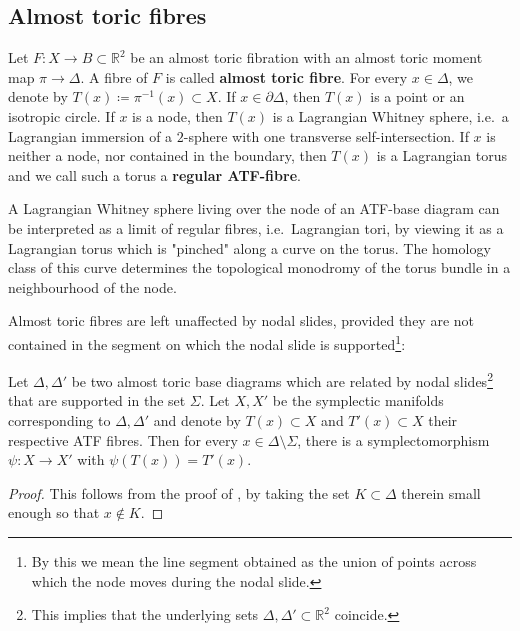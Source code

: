 \documentclass[12pt,a4paper,abstract=true,final]{scrartcl}
\begin{document}
\subsection{Almost toric fibres}
\label{sec:atfibres}

Let $F \colon X \rightarrow B \subset \mathbb{R}^2$ be an almost toric fibration with an almost toric moment map $\pi \to \Delta$.
A fibre of $F$ is called \textbf{almost toric fibre}.
For every $x \in \Delta$, we denote by $T(x) ≔ π^{-1}(x) \subset X$.
If $x \in \partial \Delta$, then $T(x)$ is a point or an isotropic circle.
If $x$ is a node, then $T(x)$ is a Lagrangian Whitney sphere, i.e.\ a Lagrangian immersion of a $2$-sphere with one transverse self-intersection.
If $x$ is neither a node, nor contained in the boundary, then $T(x)$ is a Lagrangian torus and we call such a torus a \textbf{regular ATF-fibre}.

\begin{remark}
    \label{rk:pinchedtorus}
    A Lagrangian Whitney sphere living over the node of an ATF-base diagram can be interpreted as a limit of regular fibres, i.e.\ Lagrangian tori, by viewing it as a Lagrangian torus which is "pinched" along a curve on the torus.
The homology class of this curve determines the topological monodromy of the torus bundle in a neighbourhood of the node.
\end{remark}

Almost toric fibres are left unaffected by nodal slides, provided they are not contained in the segment on which the nodal slide is supported\footnote{By this we mean the line segment obtained as the union of points across which the node moves during the nodal slide.}:

\begin{lemma}
    \label{thm:nodal_slide}
    Let $\Delta, \Delta'$ be two almost toric base diagrams which are related by nodal slides\footnote{This implies that the underlying sets $\Delta, \Delta' \subset \mathbb{R}^2$ coincide.} that are supported in the set $\Sigma$.
Let $X,X'$ be the symplectic manifolds corresponding to $\Delta,\Delta'$ and denote by $T(x) \subset X$ and $T'(x) \subset X$ their respective ATF fibres.
Then for every $x \in \Delta \setminus \Sigma$, there is a symplectomorphism $\psi \colon X \rightarrow X'$ with $\psi(T(x)) = T'(x)$.
\end{lemma}

\begin{proof}
    This follows from the proof of \cite[Theorem 8.10]{evans2021atfs}, by taking the set $K \subset \Delta$ therein small enough so that $x \notin K$.
\end{proof}
\end{document}
